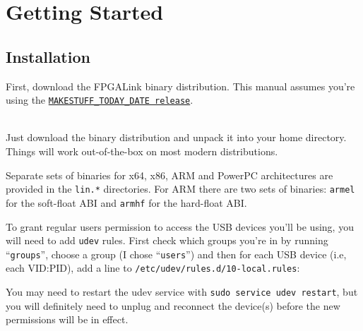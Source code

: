 \newpage
\section{Getting Started}

\subsection{Installation}
First, download the FPGALink binary distribution. This manual assumes you're using the \texttt{\href{http://www.swaton.ukfsn.org/bin/fpgalink-MAKESTUFF_TODAY_DATE/fpgalink-bin.tar.gz}{MAKESTUFF_TODAY_DATE release}}.

\begin{desc}
  \item[\sffamily{Linux:}] \hfill \\
    Just download the binary distribution and unpack it into your home directory. Things will work out-of-the-box on most modern distributions.

    Separate sets of binaries for x64, x86, ARM and PowerPC architectures are provided in the \texttt{lin.*} directories. For ARM there are two sets of binaries: \texttt{armel} for the soft-float ABI and \texttt{armhf} for the hard-float ABI.

    To grant regular users permission to access the USB devices you'll be using, you will need to add \texttt{udev} rules. First check which groups you're in by running ``\texttt{groups}'', choose a group (I chose ``\texttt{users}'') and then for each USB device (i.e, each VID:PID), add a line to \texttt{/etc/udev/rules.d/10-local.rules}:


    You may need to restart the udev service with \texttt{sudo service udev restart}, but you will definitely need to unplug and reconnect the device(s) before the new permissions will be in effect.


\end{desc}
